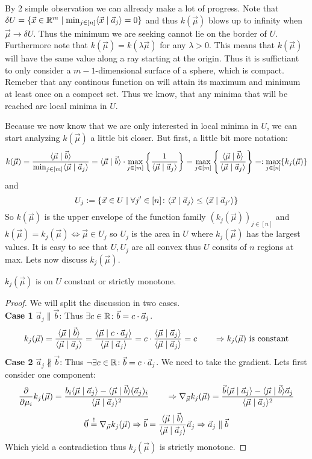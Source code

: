 By 2 simple observation we can allready make a lot of progress. Note that $\delta U = \{\vec x \in \mathbb{R}^m \mid \min_{j \in [n]}\langle \vec x \mid \vec a_j \rangle = 0\}$ and thus $k(\vec \mu)$ blows up to infinity when $\vec \mu \to \delta U$. Thus the minimum we are seeking cannot lie on the border of $U$. Furthermore note that $k(\vec \mu) = k(\lambda \vec\mu)$ for any $\lambda > 0$. This means that $k(\vec \mu)$ will have the same value along a ray starting at the origin. Thus it is suffictiant to only consider a $m-1$-dimensional surface of a sphere, which is compact. Remeber that any continous function on will attain its maximum and minimum at least once on a compect set. Thus we know, that any minima that will be reached are local minima in $U$.

Because we now know that we are only interested in local minima in $U$, we can start analyzing $k(\vec \mu)$ a little bit closer. But first, a little bit more notation:
$$k(\vec \mu) = \frac{\langle \vec{\mu} \mid \vec b \rangle}{\min_{j \in [m]} \langle \vec \mu \mid \vec a_j \rangle} = \langle \vec{\mu} \mid \vec b \rangle\cdot\max_{j \in [m]}\left\{\frac{1}{\langle \vec \mu \mid \vec a_j \rangle}\right\} = \max_{j \in [m]}\left\{\frac{\langle \vec{\mu} \mid \vec b \rangle}{\langle \vec \mu \mid \vec a_j \rangle}\right\} =: \max_{j\in[n]}\{k_j(\vec \mu)\}$$
and
$$U_j := \{\vec x \in U \mid \forall j' \in [n]\colon \langle \vec x \mid \vec a_j \rangle \leq \langle \vec x \mid \vec a_{j'} \rangle\}$$
So $k(\vec \mu)$ is the upper envelope of the function family $(k_j(\vec \mu))_{j \in [n]}$ and $k(\vec \mu) = k_j(\vec\mu) \Leftrightarrow \vec\mu \in U_j$ so $U_j$ is the area in $U$ where $k_j(\vec\mu)$ has the largest values. It is easy to see that $U, U_j$ are all convex thus $U$ consits of $n$ regions at max. Lets now discuss $k_j(\vec\mu)$.

\begin{lemma}
    $k_j(\vec\mu)$ is on $U$ constant or strictly monotone.
\end{lemma}
\begin{proof}
    We will split the discussion in two cases.\\
    \textbf{Case 1} $\vec a_j \parallel \vec b$: Thus $\exists c \in \mathbb{R}\colon \vec b = c \cdot \vec a_j$.
    $$k_j(\vec \mu) = \frac{\langle \vec \mu \mid \vec b \rangle}{\langle \vec \mu \mid \vec a_j \rangle} = \frac{\langle \vec \mu \mid c \cdot \vec a_j \rangle}{\langle \vec \mu \mid \vec a_j \rangle} = c \cdot \frac{\langle \vec \mu \mid \vec a_j \rangle}{\langle \vec \mu \mid \vec a_j \rangle} = c \qquad\Rightarrow k_j(\vec \mu)\textrm{ is constant}$$
    \textbf{Case 2} $\vec a_j \nparallel \vec b$: Thus $\lnot\exists c \in \mathbb{R}\colon \vec b = c \cdot \vec a_j$. We need to take the gradient. Lets first consider one component:
    $$\frac{\partial}{\partial \mu_i} k_j(\vec \mu) = \frac{b_i\langle \vec\mu \mid \vec a_j \rangle - \langle \vec\mu \mid \vec b \rangle(\vec a_j)_i}{\langle \vec\mu \mid \vec a_j \rangle^2} \qquad \Rightarrow \nabla_{\vec\mu} k_j(\vec\mu) = \frac{\vec b\langle \vec\mu \mid \vec a_j \rangle - \langle \vec\mu \mid \vec b \rangle\vec a_j}{\langle \vec\mu \mid \vec a_j \rangle^2}$$
    $$\vec 0 \stackrel{!}{=} \nabla_{\vec\mu} k_j(\vec\mu) \Rightarrow \vec b = \frac{\langle \vec \mu \mid \vec b \rangle}{\langle \vec \mu \mid \vec a_j \rangle}\vec a_j \Rightarrow \vec{a}_j \parallel \vec b$$
    Which yield a contradiction thus $k_j(\vec\mu)$ is strictly monotone.
\end{proof}

